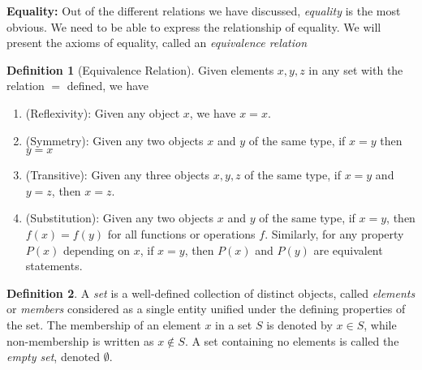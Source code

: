 \documentclass{article}
\theoremstyle{definition}
\newtheorem{definition}{Definition}[section]
\theoremstyle{remark}
\begin{document}
\textbf{Equality:} Out of the different relations we have discussed, \textit{equality} is the most obvious. We need to be able to express the relationship of equality. We will present the axioms of equality, called an \textit{equivalence relation}
\begin{definition}[Equivalence Relation]\label{def:equivalence_relation}
Given elements $x,y,z$ in any set with the relation $=$ defined, we have
\begin{enumerate}
\item (Reflexivity): Given any object $x$, we have $ x = x$.
\item (Symmetry): Given any two objects $x$ and $y$ of the same type, if $x=y$ then $y=x$
\item (Transitive): Given any three objects $x, y, z$ of the same type, if $ x = y$ and $y=z$, then $x=z$. 
\item (Substitution): Given any two objects $x$ and $y$ of the same type, if $ x = y$, then $ f(x) = f(y) $ for all functions or operations $f$. Similarly, for any property $ P(x) $ depending on $x$, if $x=y$, then $P(x)$ and $P(y)$ are equivalent statements. 
\end{enumerate}
\end{definition}



\begin{definition}\label{def:set}
A \textit{set} is a well-defined collection of distinct objects, called \textit{elements} or \textit{members} considered as a single entity unified under the defining properties of the set. The membership of an element \( x \) in a set \( S \) is denoted by \( x \in S \), while non-membership is written as \( x \notin S \). A set containing no elements is called the \textit{empty set}, denoted \( \emptyset \). 
\end{definition}
\end{document}
